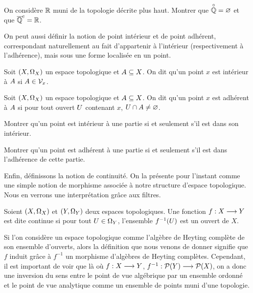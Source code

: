 \begin{exercise}
  On considère $\mathbb R$ muni de la topologie décrite plus haut. Montrer que
  $\overset{\circ}{\mathbb Q} = \varnothing$ et que $\overline{\mathbb Q}^{\mathrm c} = \mathbb R$.
\end{exercise}

On peut aussi définir la notion de point intérieur et de point adhérent,
correspondant naturellement au fait d'appartenir à l'intérieur (respectivement à
l'adhérence), mais sous une forme localisée en un point.

\begin{definition}
  Soit $(X,\Omega_{X})$ un espace topologique et $A\subseteq X$. On dit
  qu'un point $x$ est intérieur à $A$ si $A\in\mathcal{V}_{x}$.
\end{definition}

\begin{definition}
  Soit $(X,\Omega_{X})$ un espace topologique et $A\subseteq X$. On dit
  qu'un point $x$ est adhérent à $A$ si pour tout ouvert $U$
  contenant $x$, $U\cap A\neq \varnothing$.
\end{definition}

\begin{exercise}
  Montrer qu'un point est intérieur à une partie si et seulement s'il est dans
  son intérieur.
\end{exercise}

\begin{exercise}\label{exo.carac.adhe}
  Montrer qu'un point est adhérent à une partie si et seulement s'il est dans
  l'adhérence de cette partie.
\end{exercise}

Enfin, définissons la notion de continuité. On la présente pour l'instant comme
une simple notion de morphisme associée à notre structure d'espace topologique.
Nous en verrons une interprétation grâce aux filtres.

\begin{definition}
  Soient $(X,\Omega_{X})$ et $(Y,\Omega_{Y})$ deux espaces topologiques. Une
  fonction $f : \displaystyle X \longrightarrow Y$ est dite continue si pour tout
  $U\in\Omega_{Y}$, l'ensemble $f^{-1}(U)$ est un ouvert de $X$.
\end{definition}

\begin{remark}
  Si l'on considère un espace topologique comme l'algèbre de Heyting
  complète de son ensemble d'ouverts, alors la définition que nous venons de
  donner signifie que $f$ induit grâce à $f^{-1}$ un morphisme d'algèbres de
  Heyting complètes.
  Cependant, il est important de voir que là où $f : \displaystyle X \longrightarrow Y$,
  $f^{-1} : \displaystyle \mathcal{P}(Y) \longrightarrow \mathcal{P}(X)$, on a donc une inversion du
  sens entre le point de vue algébrique par un ensemble ordonné et le point de
  vue analytique comme un ensemble de points muni d'une topologie.
\end{remark}

